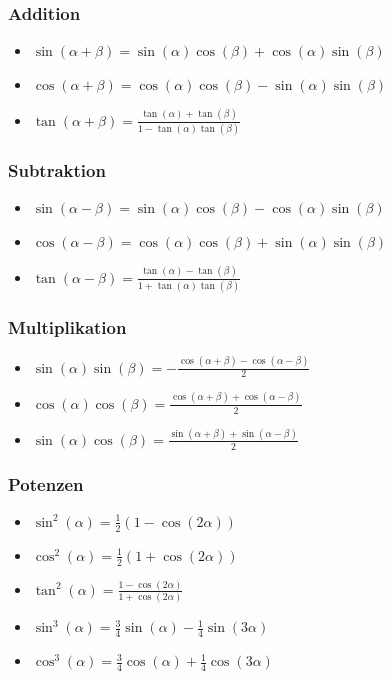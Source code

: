 \documentclass[a4paper,10pt]{article}
\begin{document}
\subsubsection{Addition}
\begin{itemize}
 \item $\sin(\alpha + \beta) = \sin(\alpha) \cos(\beta) + \cos(\alpha) \sin(\beta)$
 \item $\cos(\alpha + \beta) = \cos(\alpha) \cos(\beta) - \sin(\alpha) \sin(\beta)$
 \item $\tan(\alpha + \beta) = \frac{\tan(\alpha) + \tan(\beta)}{1 - \tan(\alpha) \tan(\beta)}$
\end{itemize}

\subsubsection{Subtraktion}
\begin{itemize}
 \item $\sin(\alpha - \beta) = \sin(\alpha) \cos(\beta) - \cos(\alpha)\sin(\beta)$
 \item $\cos(\alpha - \beta) = \cos(\alpha) \cos(\beta) + \sin(\alpha)\sin(\beta)$
 \item $\tan(\alpha - \beta) = \frac{\tan(\alpha) - \tan(\beta)}{1+\tan(\alpha) \tan(\beta)}$
\end{itemize}

\subsubsection{Multiplikation}
\begin{itemize}
 \item $\sin(\alpha) \sin(\beta) = -\frac{\cos(\alpha + \beta) - \cos(\alpha - \beta)}{2}$
 \item $\cos(\alpha) \cos(\beta) =  \frac{\cos(\alpha + \beta) + \cos(\alpha - \beta)}{2}$
 \item $\sin(\alpha) \cos(\beta) =  \frac{\sin(\alpha + \beta) + \sin(\alpha - \beta)}{2}$
\end{itemize}

\subsubsection{Potenzen}
\begin{itemize}
 \item $\sin^2(\alpha) = \frac{1}{2}(1-\cos(2\alpha))$
 \item $\cos^2(\alpha) = \frac{1}{2}(1+\cos(2\alpha))$
 \item $\tan^2(\alpha) = \frac{1-\cos(2\alpha)}{1+\cos(2\alpha)}$
 \item $\sin^3(\alpha) = \frac{3}{4} \sin(\alpha) - \frac{1}{4} \sin(3 \alpha)$
 \item $\cos^3(\alpha) = \frac{3}{4} \cos(\alpha) + \frac{1}{4} \cos(3 \alpha)$
\end{itemize}
\end{document}
